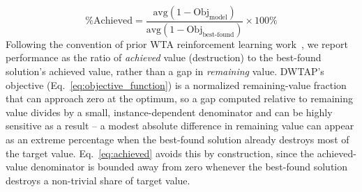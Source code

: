 \documentclass[smallcondensed]{svjour3}
\begin{document}
\begin{equation}\label{eq:achieved}
\text{\% Achieved} = \frac{\text{avg}(1 - \text{Obj}_{\text{model}})}{\text{avg}(1 - \text{Obj}_{\text{best-found}})} \times 100\%
\end{equation}
Following the convention of prior WTA reinforcement learning work~\cite{gaudet2023}, we report performance as the ratio of \emph{achieved} value (destruction) to the best-found solution's achieved value, rather than a gap in \emph{remaining} value. DWTAP's objective (Eq.~\eqref{eq:objective_function}) is a normalized remaining-value fraction that can approach zero at the optimum, so a gap computed relative to remaining value divides by a small, instance-dependent denominator and can be highly sensitive as a result -- a modest absolute difference in remaining value can appear as an extreme percentage when the best-found solution already destroys most of the target value. Eq.~\eqref{eq:achieved} avoids this by construction, since the achieved-value denominator is bounded away from zero whenever the best-found solution destroys a non-trivial share of target value.
\end{document}
